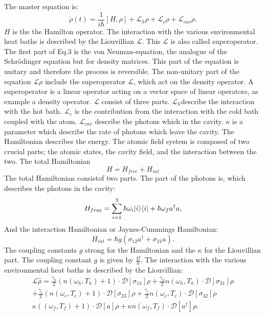 \documentclass[12pt,a4paper]{article}
\DeclarePairedDelimiter\bra{\langle}{\rvert}
\DeclarePairedDelimiter\ket{\lvert}{\rangle}
\begin{document}
The master equation is:
\begin{equation}
\dot{\rho}(t)=\frac{1}{i \hbar}[H,\rho]+ \mathcal{L}_{h}\rho+ \mathcal{L}_{c}\rho+ \mathcal{L}_{cav}\rho.\label{eins}
\end{equation}
$H$ is the the Hamilton operator. The interaction with the various environmental heat baths is described by the Liouvillian $\mathcal{L}$. This $\mathcal{L}$ is also called superoperator. 
The first part of Eq.3 is the von Neuman-equation,  the analogue of the Schrödinger equation but for density matrices. This part of the equation is unitary and therefore the process is reversible.
The non-unitary part of the equation $\mathcal{L}\rho$ include the superoperator $\mathcal{L}$, which act on the density operator.  A superoperator is a linear operator acting on a vector space of linear operators, as example a density operator.
$\mathcal{L}$ consist of three parts. $\mathcal{L}_h $describe the interaction with the hot bath.
$\mathcal{L}_c$ is the contribution from the interaction with the cold bath coupled with the atom.
$\mathcal{L}_{cav}$ describe the photons which in the cavity. $\kappa$ is a parameter which describe the rate of photons which leave the cavity.
The Hamiltonian describes the energy. 
The atomic field system is composed of two crucial 
parts; the atomic states, the cavity field, and the interaction between the two.
The total Hamiltonian
\begin{equation}
H=H_{free}+H_{int}
\end{equation}
The total Hamiltonian consistof two parts. The part of the photons is, which describes the photons in the cavity:
\begin{equation}
H_{free}=\sum_{i=1}^3 \hbar \omega_i \ket{i}\bra{i}+\hbar \omega_f a^{\dag}a,
\end{equation}
And the interaction Hamiltonian or Jaynes-Cummings Hamiltonian:
\begin{equation}
H_{int}=\hbar g(\sigma_{12}a^{\dag}+\sigma_{21}a).
\end{equation}
The coupling constants $g$ strong for the Hamiltonian and the $\kappa$ for the Liouvillian part. 
The coupling constant $g$ is given by $\frac{\Omega}{\hbar}$.
\newpage
The interaction with the various environmental heat baths is described by the Liouvillian:
\begin{equation}
\begin{aligned}
\mathcal{L}\hat{\rho}=\frac{\gamma_h}{2}(n(\omega_h,T_h)+1)   \cdot \mathcal{D}[\sigma_{13}]\rho
+\frac{\gamma_h}{2}n(\omega_h,T_h)\cdot \mathcal{D}[\sigma_{31}]\rho \\
+\frac{\gamma_c}{2}(n(\omega_c,T_c)+1)\cdot \mathcal{D}[\sigma_{23}]\rho
+\frac{\gamma_c}{2}n(\omega_c,T_c) \cdot \mathcal{D}[\sigma_{32}]\rho \\
\kappa((\omega_f,T_f)+1)	\cdot\mathcal{D}[a]\rho+
\kappa n(\omega_f,T_f)\cdot \mathcal{D}[a^{\dag}]\rho.
\end{aligned}
\end{equation}
\end{document}

